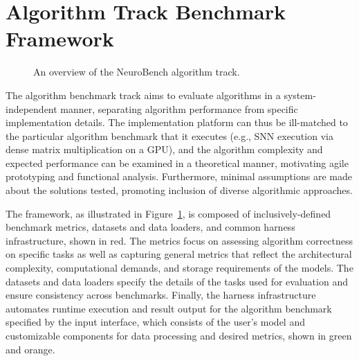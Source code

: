 \section*{Algorithm Track Benchmark Framework}
\begin{figure}[t]
            \centering
            
            \caption{An overview of the NeuroBench algorithm track.}
        \label{fig:AlgTrack_SA}
    \end{figure}

The algorithm benchmark track aims to evaluate algorithms in a system-independent manner, separating algorithm performance from specific implementation details. The implementation platform can thus be ill-matched to the particular algorithm benchmark that it executes (e.g., SNN execution via dense matrix multiplication on a GPU), and the algorithm complexity and expected performance can be examined in a theoretical manner, motivating agile prototyping and functional analysis. Furthermore, minimal assumptions are made about the solutions tested, promoting inclusion of diverse algorithmic approaches.

The framework, as illustrated in Figure~\ref{fig:AlgTrack_SA}, is composed of inclusively-defined benchmark metrics, datasets and data loaders, and common harness infrastructure, shown in red. The metrics focus on assessing algorithm correctness on specific tasks as well as capturing general metrics that reflect the architectural complexity, computational demands, and storage requirements of the models. The datasets and data loaders specify the details of the tasks used for evaluation and ensure consistency across benchmarks. Finally, the harness infrastructure automates runtime execution and result output for the algorithm benchmark specified by the input interface, which consists of the user's model and customizable components for data processing and desired metrics, shown in green and orange.





